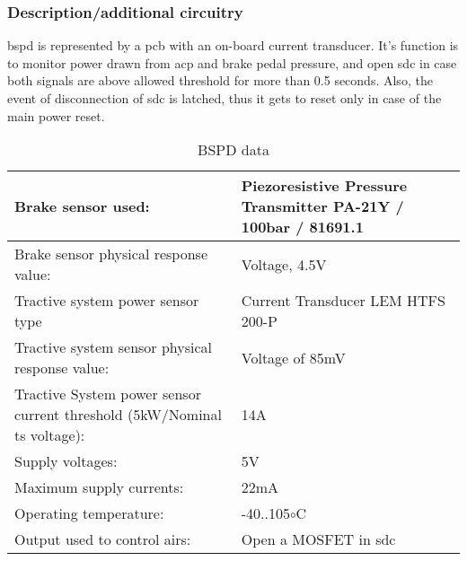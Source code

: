 
\subsubsection{Description/additional circuitry}

\Gls{bspd} is represented by a \gls{pcb} with an on-board current transducer. It’s function is to monitor
power drawn from \gls{acp} and brake pedal pressure, and open \gls{sdc} in case both signals are above
allowed threshold for more than 0.5 seconds. Also, the event of disconnection of \gls{sdc} is latched,
thus it gets to reset only in case of the main power reset.


\begin{table}[H]
	\centering
	\caption{BSPD data}
	\begin{tabularx}{\textwidth}{|X|X|}
		\hline
		Brake sensor used: & Piezoresistive Pressure Transmitter PA-21Y / 100bar / 81691.1 \\[\TableSize]
		\hline
		Brake sensor physical response value: & Voltage, 4.5V \\[\TableSize]
		\hline
		Tractive system power sensor type & Current Transducer LEM HTFS 200-P \\[\TableSize]
		\hline
		Tractive system sensor physical response value: & Voltage of 85mV \\[\TableSize]
		\hline
		Tractive System power sensor current threshold (5kW/Nominal \gls{ts} voltage): & 14A \\[\TableSize]
		\hline
		Supply voltages: & 5V \\[\TableSize]
		\hline
		Maximum supply currents: & 22mA \\[\TableSize]
		\hline
		Operating temperature: & -40..105$\circ$C\\[\TableSize]
		\hline
		Output used to control \glspl{air}: & Open a MOSFET in \gls{sdc} \\[\TableSize]
		\hline
	\end{tabularx}%
	\label{tab:bspd}%
\end{table}%
\iffalse
\begin{figure}[H]
	\centering
	\texttt{[image: ./img/bspd-position.jpg]}
	\caption{\Gls{bspd} flowchart.}
	\label{fig:BSPD-flowchart}
\end{figure}\fi

